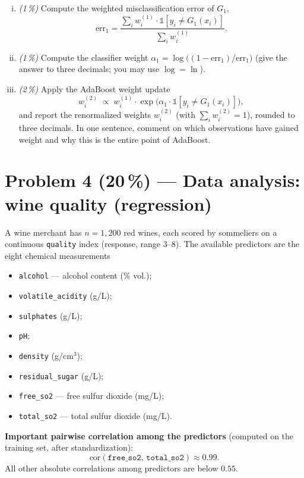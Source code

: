 \documentclass[11pt,a4paper]{article}
\newcommand{\points}[1]{\textbf{(#1\,\%)}}
\newcommand{\subpoints}[1]{\textit{(#1\,\%)}}
\begin{document}
\begin{enumerate}[(i)]
  \item \subpoints{1} Compute the weighted misclassification error of $G_1$,
  $$\mathrm{err}_1 = \frac{\sum_i w_i^{(1)} \cdot \mathbb{1}[y_i \neq G_1(x_i)]}{\sum_i w_i^{(1)}}.$$
  \item \subpoints{1} Compute the classifier weight $\alpha_1 = \log\!\bigl((1 - \mathrm{err}_1)/\mathrm{err}_1\bigr)$ (give the answer to three decimals; you may use $\log = \ln$).
  \item \subpoints{2} Apply the AdaBoost weight update
  $$w_i^{(2)} \;\propto\; w_i^{(1)} \cdot \exp\!\bigl(\alpha_1 \cdot \mathbb{1}[y_i \neq G_1(x_i)]\bigr),$$
  and report the renormalized weights $w_i^{(2)}$ (with $\sum_i w_i^{(2)} = 1$), rounded to three decimals. In one sentence, comment on which observations have gained weight and why this is the entire point of AdaBoost.
\end{enumerate}

\vfill\eject

\section*{Problem 4 \points{20} --- Data analysis: wine quality (regression)}

A wine merchant has $n = 1{,}200$ red wines, each scored by sommeliers on a continuous \texttt{quality} index (response, range $3$--$8$). The available predictors are the eight chemical measurements
\begin{itemize}
  \item \texttt{alcohol} --- alcohol content (\% vol.);
  \item \texttt{volatile\_acidity} (g/L);
  \item \texttt{sulphates} (g/L);
  \item \texttt{pH};
  \item \texttt{density} (g/cm$^3$);
  \item \texttt{residual\_sugar} (g/L);
  \item \texttt{free\_so2} --- free sulfur dioxide (mg/L);
  \item \texttt{total\_so2} --- total sulfur dioxide (mg/L).
\end{itemize}

\textbf{Important pairwise correlation among the predictors} (computed on the training set, after standardization):
$$\mathrm{cor}(\texttt{free\_so2},\, \texttt{total\_so2}) \approx 0.99.$$
All other absolute correlations among predictors are below $0.55$.
\end{document}
